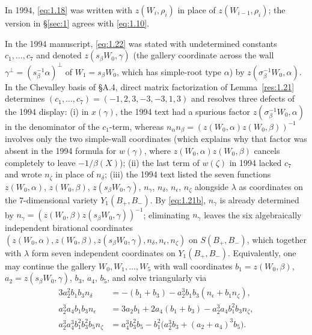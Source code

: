 \documentclass[12pt,letterpaper]{amsart}
\theoremstyle{plain}
\theoremstyle{definition}
\theoremstyle{remark}
\theoremstyle{definition}
\begin{document}
\begin{rem26}\label{rem:1.18}
In 1994, \eqref{eq:1.18} was written with $z(W_i,\rho_i)$ in place of
$z(W_{i-1},\rho_i)$; the version in \S\ref{sec:1} agrees with \eqref{eq:1.10}.
\end{rem26}

\begin{rem26}\label{rem:1.22}
In the 1994 manuscript, \eqref{eq:1.22} was stated with undetermined constants
$c_1,\dots,c_7$ and denoted $z(s_\beta W_0,\gamma)$ (the gallery coordinate
across the wall $\gamma^\perp=(s_\beta^{-1}\alpha)^\perp$ of $W_1=s_\beta W_0$,
which has simple-root type $\alpha$) by $z(\sigma_\beta^{-1}W_0,\alpha)$.
In the Chevalley basis of \S A.4, direct matrix factorization of Lemma~\ref{res:1.21}
determines $(c_1,\dots,c_7)=(-1,2,3,-3,-3,1,3)$ and resolves three defects of
the 1994 display:
(i) in $x(\gamma)$, the 1994 text had a spurious factor
$z(\sigma_\beta^{-1}W_0,\alpha)$ in the denominator of the $c_1$-term, whereas
$n_\alpha n_\beta=(z(W_0,\alpha)z(W_0,\beta))^{-1}$ involves only the two
simple-wall coordinates (which explains why that factor was absent in the 1994
formula for $w(\gamma)$, where $z(W_0,\alpha)z(W_0,\beta)$ cancels completely to
leave $-1/\beta(X)$);
(ii) the last term of $w(\zeta)$ in 1994 lacked $c_7$ and wrote $n_\zeta$ in
place of $n_\delta$;
(iii) the 1994 text listed the seven functions
$z(W_0,\alpha)$, $z(W_0,\beta)$, $z(s_\beta W_0,\gamma)$, $n_\gamma$, $n_\delta$,
$n_\epsilon$, $n_\zeta$ alongside $\lambda$ as coordinates on the
$7$-dimensional variety $Y_1(B_+,B_-)$. By \eqref{eq:1.21b}, $n_\gamma$ is
already determined by $n_\gamma=(z(W_0,\beta)z(s_\beta W_0,\gamma))^{-1}$;
eliminating $n_\gamma$ leaves the six algebraically independent birational
coordinates $(z(W_0,\alpha),z(W_0,\beta),z(s_\beta W_0,\gamma),n_\delta,n_\epsilon,n_\zeta)$
on $S(B_+,B_-)$,
which together with $\lambda$ form seven independent coordinates on $Y_1(B_+,B_-)$.
Equivalently, one may continue the gallery $W_0,W_1,\dots,W_5$ with wall
coordinates $b_1=z(W_0,\beta)$, $a_2=z(s_\beta W_0,\gamma)$, $b_3$, $a_4$, $b_5$,
and solve triangularly via
\begin{align*}
3a_2^2 b_1 b_3 n_\delta &= -(b_1+b_3) - a_2^3 b_1 b_3(n_\epsilon + b_1 n_\zeta),\\
a_2^3 a_4 b_1 b_3 n_\epsilon &= 3a_2 b_1 + 2a_4(b_1+b_3) - a_2^3 a_4 b_1^2 b_3 n_\zeta,\\
a_2^3 a_4^3 b_1^2 b_3^2 b_5 n_\zeta &= a_4^3 b_3^2 b_5 - b_1^2\bigl(a_2^3 b_3 + (a_2+a_4)^3 b_5\bigr).
\end{align*}
\end{rem26}
\end{document}
